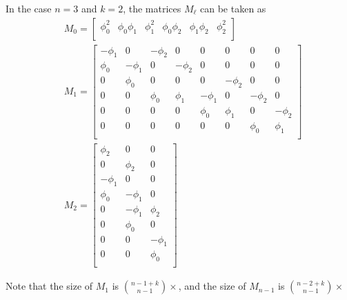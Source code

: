 \documentclass[fleqn,reqno]{amsart}
\numberwithin{first}{chapter}
\numberwithin{section}{chapter}
\numberwithin{equation}{first}
\begin{document}
\begin{example}
	\label{ex:koszul-syzygies}
	In the case $n=3$ and $k=2$, the matrices $M_\ell$ can be taken as
	\begin{align*}
		&M_0=\begin{bmatrix}\phi_{0}^{2}&
		      \phi_{0} \phi_{1}&
		      \phi_{1}^{2}&
		      \phi_{0} \phi_{2}&
		      \phi_{1} \phi_{2}&
		      \phi_{2}^{2}\\
		      \end{bmatrix}\nonumber\\
		&M_1=\begin{bmatrix}{-{\phi}_{1}}&
	      0&
	      {-\phi_{2}}&
	      0&
	      0&
	      0&
	      0&
	      0\\
	      \phi_{0}&
	      {-\phi_{1}}&
	      0&
	      {-\phi_{2}}&
	      0&
	      0&
	      0&
	      0\\
	      0&
	      \phi_{0}&
	      0&
	      0&
	      0&
	      {-\phi_{2}}&
	      0&
	      0\\
	      0&
	      0&
	      \phi_{0}&
	      \phi_{1}&
	      {-\phi_{1}}&
	      0&
	      {-\phi_{2}}&
	      0\\
	      0&
	      0&
	      0&
	      0&
	      \phi_{0}&
	      \phi_{1}&
	      0&
	      {-\phi_{2}}\\
	      0&
	      0&
	      0&
	      0&
	      0&
	      0&
	      \phi_{0}&
	      \phi_{1}\\
	      \end{bmatrix}\\
		  &M_2=\begin{bmatrix}\phi_{2}&
	      0&
	      0\\
	      0&
	      \phi_{2}&
	      0\\
	      {-\phi_{1}}&
	      0&
	      0\\
	      \phi_{0}&
	      {-\phi_{1}}&
	      0\\
	      0&
	      {-\phi_{1}}&
	      \phi_{2}\\
	      0&
	      \phi_{0}&
	      0\\
	      0&
	      0&
	      {-\phi_{1}}\\
	      0&
	      0&
	      \phi_{0}\\
      \end{bmatrix}\nonumber
	\end{align*}
	
	Note that the size of $M_1$ is $\binom{n-1+k}{n-1}\times$,
	and the size of $M_{n-1}$ is $\binom{n-2+k}{n-1}\times$
\end{example}
\end{document}
